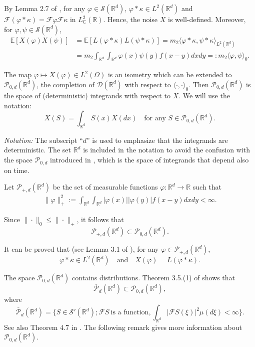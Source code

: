 \documentclass[12pt]{article}
\def\cB{\mathcal{B}}
\def\cD{\mathcal{D}}
\def\cF{\mathcal{F}}
\def\cP{\mathcal{P}}
\def\cS{\mathcal{S}}
\def\bC{\mathbb{C}}
\def\bE{\mathbb{E}}
\def\bR{\mathbb{R}}
\def\k{\kappa}
\begin{document}
By Lemma 2.7 of \cite{BJ26}, for any $\varphi \in \cS(\bR^d)$, $\varphi* \k \in L^2(\bR^d)$ and $\cF (\varphi * \k)=\cF \varphi \cF \k$ in $L^2_{\bC}(\bR)$. Hence,
the noise $X$ is well-defined. Moreover, for $\varphi,\psi \in \cS(\bR^d)$,
\begin{align}
\nonumber
\bE[X(\varphi) X(\psi)]&=\bE[L(\varphi * \k) L(\psi *\k)]=m_2\langle \varphi*\k,\psi*\k \rangle_{L^2(\bR^d)}\\
\label{def-prod0}
&=m_2 \int_{\bR^d} \int_{\bR^d}\varphi(x)\psi(y)f(x-y)dxdy =:m_2 \langle \varphi,\psi \rangle_0.
\end{align}
 
 
 
The map $\varphi \mapsto X(\varphi) \in L^2(\Omega)$ is an isometry which can be extended to $\cP_{0,d}(\bR^d)$, the completion of $\cD(\bR^d)$ with respect to $\langle \cdot,\cdot \rangle_0$.  Then $\cP_{0,d}(\bR^d)$ is the space of (deterministic) integrands with respect to $X$.  We will use the notation:
\[
X(S)=\int_{\bR^d}S(x)X(dx) \quad  \mbox{for any $S \in \cP_{0,d}(\bR^d)$}.
\]

\medskip

{\em Notation:} 
The subscript ``$d$'' is used to emphasize that the integrands are deterministic. The set $\bR^d$ is included in the notation to avoid the confusion with the space $\cP_{0,d}$ introduced in \cite{BJ26}, which is the space of integrands that depend also on time. 

\medskip

Let $\cP_{+,d}(\bR^d)$ be the set of measurable functions $\varphi:\bR^d \to \bR$ such that
\begin{align*}
\| \varphi\|_{+}^2:= \int_{\bR^d}\int_{\bR^d}|\varphi(x)||\varphi(y)| f(x-y)dxdy<\infty.
\end{align*}

Since $\|\cdot\|_0 \leq \|\cdot\|_{+}$, it follows that
\[
\cP_{+,d}(\bR^d) \subset \cP_{0,d}(\bR^d).
\]

It can be proved that (see Lemma 3.1 of \cite{BJ26}), for any $\varphi \in \cP_{+,d}(\bR^d)$, 
\[
\varphi*\k \in L^2(\bR^d) \quad \mbox{and} \quad X(\varphi)=L(\varphi*\k).
\]



The space $\cP_{0,d}(\bR^d)$ contains distributions. Theorem 3.5.(1) of \cite{BGP12} shows that
\[
\overline{\cP}_d(\bR^d) \subset \cP_{0,d}(\bR^d),
\]
where 
\[
\overline{\cP}_d(\bR^d)
=\{S \in \cS'(\bR^d); \cF S \ \mbox{is a function}, \int_{\bR^d}|\cF S(\xi)|^2 \mu(d\xi)<\infty \}.
\]
See also Theorem 4.7 in \cite{B15}. The following remark gives more information about 
$\cP_{0,d}(\bR^d)$.
\end{document}
